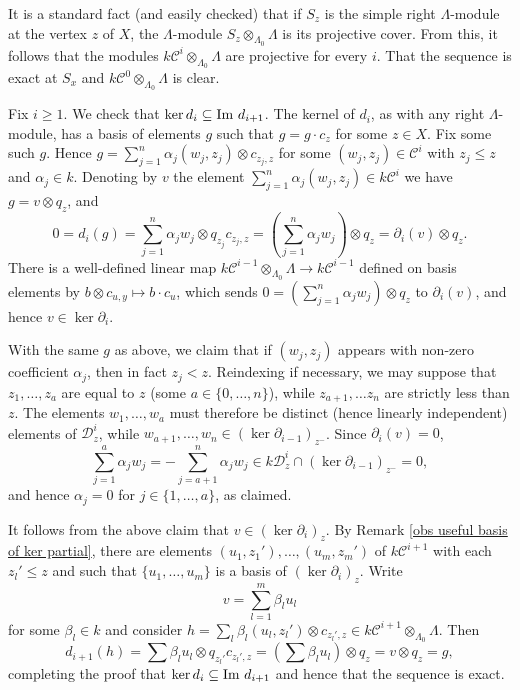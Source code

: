 \documentclass[preprint,review,12pt]{elsarticle}
\newcommand{\im}{{\textnormal{Im }}}
\newcommand{\C}{{\mathcal C}}
\begin{document}
\begin{pf}
It is a standard fact (and easily checked) that if $S_z$ is the simple right $\Lambda$-module at the vertex $z$ of $X$, the $\Lambda$-module $S_z\otimes_{\Lambda_0}\Lambda$ is its projective cover.  From this, it follows that the modules $k\C^{i}\otimes_{\Lambda_0}\Lambda$ are projective for every $i$.  That the sequence is exact at $S_x$ and $k\C^{0}\otimes_{\Lambda_0}\Lambda$ is clear.
 
Fix $i\geqslant 1$.  We check that $\ker d_i\subseteq \im d_{i+1}$.  The kernel of $d_{i}$, as with any right $\Lambda$-module, has a basis of elements $g$ such that $g = g\cdot c_z$ for some $z\in X$.  Fix some such $g$. Hence $g = \sum_{j=1}^n\alpha_j(w_j,z_j)\otimes c_{z_j,z}$ for some $(w_j,z_j)\in \C^i$ with $z_j \leqslant z$ and $\alpha_j\in k$.  Denoting by $v$ the element $\sum_{j=1}^n \alpha_j(w_j,z_j) \in k\C^{i}$ we have $g = v\otimes q_z$, and 
	$$0 = d_i(g) = \sum_{j=1}^n\alpha_jw_j\otimes q_{z_j}c_{z_j,z} = (\sum_{j=1}^n\alpha_jw_j)\otimes q_z = \partial_i(v)\otimes q_z.$$
There is a well-defined linear map $k\C^{i-1}\otimes_{\Lambda_0} \Lambda \to k\C^{i-1}$ defined on basis elements by $b\otimes c_{u,y}\mapsto b\cdot c_u$, which sends $0 = (\sum_{j=1}^n\alpha_jw_j)\otimes q_z$ to $\partial_i(v)$, and hence $v\in \ker \partial_i$.

With the same $g$ as above, we claim that if $(w_j,z_j)$ appears with non-zero coefficient $\alpha_j$, then in fact $z_j < z$.  Reindexing if necessary, we may suppose that $z_1, \hdots, z_a$ are equal to $z$ (some $a\in \{0, \hdots, n\}$), while $z_{a+1}, \hdots z_n$ are strictly less than $z$.  The elements $w_1, \hdots, w_a$ must therefore be distinct (hence linearly independent) elements of ${\mathcal{D}^{i}_z}$, while $w_{a+1}, \hdots, w_n\in (\ker \partial_{i-1})_{z^-}$.  Since $\partial_i(v) = 0$,
	$$\sum_{j=1}^a\alpha_j w_j = -\sum_{j=a+1}^n\alpha_j w_j \in k{\mathcal{D}^{i}_z} \cap (\ker \partial_{i-1})_{z^-} = 0,$$
and hence $\alpha_j = 0$ for $j\in \{1, \hdots, a\}$, as claimed.

It follows from the above claim that $v\in (\ker \partial_i)_z$.  By Remark \ref{obs useful basis of ker partial}, there are elements $(u_1,z_1'), \hdots, (u_m,z_m')$ of $k\C^{i+1}$ with each $z_l'\leqslant z$ and such that $\{u_1, \hdots, u_m\}$ is a basis of $(\ker \partial_i)_z$.  Write
	$$v = \sum_{l=1}^m\beta_lu_l$$
for some $\beta_l\in k$ and consider $h = \sum_l \beta_l(u_l,z_l')\otimes c_{z_l',z}\in k\C^{i+1}\otimes_{\Lambda_0} \Lambda$.  Then 
	$$d_{i+1}(h) = \sum\beta_lu_l\otimes q_{z_l'}c_{z_l',z} =  (\sum \beta_lu_l)\otimes q_z = v\otimes q_z = g,$$
completing the proof that $\ker d_i\subseteq \im d_{i+1}$ and hence that the sequence is exact.


\end{pf}
\end{document}
